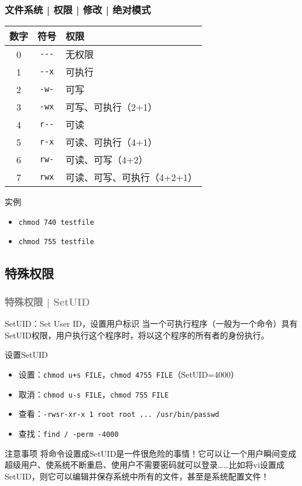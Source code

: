 \begin{frame}[fragile]
  \frametitle{文件系统 | 权限 | 修改 | \alert{绝对模式}}
  \begin{table}
    \centering
    \begin{tabular}{ccl}
      \hline
      \rowcolor{blue!50}数字 & 符号 & 权限\\
      \hline
      0 & \verb|---| & 无权限\\
      1 & \verb|--x| & 可执行\\
      2 & \verb|-w-| & 可写\\
      3 & \verb|-wx| & 可写、可执行（2+1）\\
      4 & \verb|r--| & 可读\\
      5 & \verb|r-x| & 可读、可执行（4+1）\\
      6 & \verb|rw-| & 可读、可写（4+2）\\
      7 & \verb|rwx| & 可读、可写、可执行（4+2+1）\\
      \hline
    \end{tabular}
  \end{table}
  \pause
  \begin{block}{实例}
    \begin{itemize}
      \item \verb|chmod 740 testfile|
      \item \verb|chmod 755 testfile|
    \end{itemize}
  \end{block}
\end{frame}

\subsection{特殊权限}
\begin{frame}[fragile]
  \frametitle{\textcolor{gray}{特殊权限 | SetUID}}
  \begin{block}{SetUID：Set User ID，设置用户标识}
    当一个可执行程序（一般为一个命令）具有SetUID权限，用户执行这个程序时，将以这个程序的所有者的身份执行。
  \end{block}
  \vspace{-0.5em}
  \pause
  \begin{block}{设置SetUID}
    \begin{itemize}
      \item 设置：\verb|chmod u+s FILE|，\verb|chmod 4755 FILE|（SetUID=4000）
      \item 取消：\verb|chmod u-s FILE|，\verb|chmod 755 FILE|
      \item 查看：\verb|-rwsr-xr-x 1 root root ... /usr/bin/passwd|
      \item 查找：\verb|find / -perm -4000|
    \end{itemize}
  \end{block}
  \vspace{-0.5em}
  \pause
  \begin{block}{注意事项}
将命令设置成SetUID是一件很危险的事情！它可以让一个用户瞬间变成超级用户、使系统不断重启、使用户不需要密码就可以登录……比如将vi设置成SetUID，则它可以编辑并保存系统中所有的文件，甚至是系统配置文件！
  \end{block}
\end{frame}

